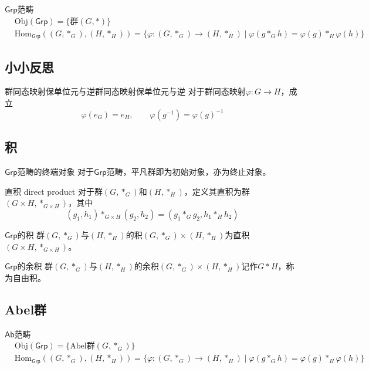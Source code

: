 \begin{definition}{$\mathsf{Grp}$范畴}
	\begin{align*}
		&\mathrm{Obj}(\mathsf{Grp})=\{ \text{群} (G,*) \}\\
		&\mathrm{Hom}_\mathsf{Grp}((G,*_G),(H,*_H))=\{ \varphi:(G,*_G)\to (H,*_H)\mid \varphi(g*_G h)=\varphi(g)*_H\varphi(h)\}
	\end{align*}
\end{definition}

\subsection{小小反思}

\begin{proposition}{群同态映射保单位元与逆}{群同态映射保单位元与逆}
	对于群同态映射$\varphi:G\to H$，成立
	$$
	\varphi(e_G)=e_H,\qquad 
	\varphi(g^{-1})=\varphi(g)^{-1}
	$$
\end{proposition}

\subsection{积}

\begin{proposition}{$\mathsf{Grp}$范畴的终端对象}
	对于$\mathsf{Grp}$范畴，平凡群即为初始对象，亦为终止对象。
\end{proposition}

\begin{definition}{直积 direct product}
	对于群$(G,*_G)$和$(H,*_H)$，定义其直积为群$(G\times H,*_{G\times H})$，其中
	$$
	(g_1,h_1)*_{G\times H}(g_2,h_2)=(g_1*_Gg_2,h_1*_Hh_2)
	$$
\end{definition}

\begin{definition}{$\mathsf{Grp}$的积}
	群$(G,*_G)$与$(H,*_H)$的积$(G,*_G)\times (H,*_H)$为直积$(G\times H,*_{G\times H})$。
\end{definition}

\begin{definition}{$\mathsf{Grp}$的余积}
	群$(G,*_G)$与$(H,*_H)$的余积$(G,*_G)\times (H,*_H)$记作$G*H$，称为自由积。
\end{definition}

\subsection{Abel群}

\begin{definition}{$\mathsf{Ab}$范畴}
	\begin{align*}
		&\mathrm{Obj}(\mathsf{Grp})=\{ \text{Abel群} (G,*_G) \}\\
		&\mathrm{Hom}_\mathsf{Grp}((G,*_G),(H,*_H))=\{ \varphi:(G,*_G)\to (H,*_H)\mid \varphi(g*_G h)=\varphi(g)*_H\varphi(h)\}
	\end{align*}
\end{definition}

